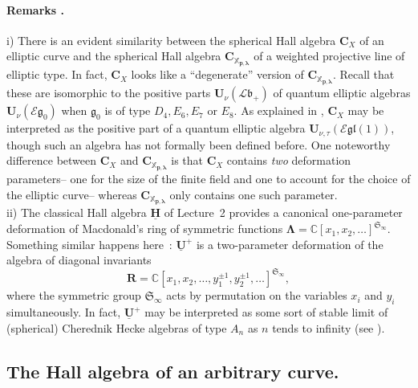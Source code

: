 \documentclass[a4paper,10pt]{amsart}
\def\H{\mathbf{H}}
\def\U{\mathbf{U}}
\def\C{\mathbb{C}}
\def\CC{\mathbf{C}}
\def\g{\mathfrak{g}}
\def\bo{\mathfrak{b}}
\def\LLambda{\boldsymbol{\Lambda}}
\def\xpl{\mathbb{X}_{\mathbf{p},\boldsymbol{\lambda}}}
\numberwithin{equation}{section}
\begin{document}
{\paragraph{\textbf{Remarks \thetheo.}} i) There is an evident similarity between the spherical Hall algebra $\CC_X$ of an elliptic curve and the spherical Hall algebra $\CC_{\xpl}$ of a weighted projective line of elliptic type. In fact, $\CC_X$ looks like a ``degenerate'' version of $\CC_{\xpl}$. Recall that these are isomorphic to the positive parts $\U_{\nu}(\mathcal{L}\bo_+)$ of quantum elliptic algebras $\U_{\nu}(\mathcal{E}{\g_0})$ when $\g_0$ is of type $D_4, E_6, E_7$ or $E_8$. As explained in \cite{SV}, $\CC_X$ may be interpreted as the positive part of a quantum elliptic algebra $\U_{\nu, \tau}(\mathcal{E}{\mathfrak{gl}(1)})$, though such an algebra has not formally been defined before. One noteworthy difference between $\CC_X$ and $\CC_{\xpl}$ is that $\CC_X$ contains \textit{two} deformation parameters-- one for the size of the finite field and one to account for the choice of the elliptic curve-- whereas $\CC_{\xpl}$ only contains one such parameter.\\
ii) The classical Hall algebra $\underline{\H}$ of Lecture~2 provides a canonical one-parameter deformation of Macdonald's ring of symmetric functions $\LLambda=\C[x_1,x_2, \ldots]^{\mathfrak{S}_{\infty}}$. Something similar happens here~: $\underline{\U}^+$ is a two-parameter  deformation of the algebra of diagonal invariants
$$\mathbf{R}=\C[x_1, x_2, \ldots, y_1^{\pm 1}, y_2^{\pm 1}, \ldots ]^{\mathfrak{S}_{\infty}},$$
where the symmetric group $\mathfrak{S}_{\infty}$ acts by permutation on the variables $x_i$ and $y_i$ simultaneously. In fact, $\underline{\U}^+$ may be interpreted as some sort of stable limit of (spherical) Cherednik Hecke algebras of type $A_n$ as $n$ tends to infinity (see \cite{SV}).

\vspace{.2in}

\subsection{The Hall algebra of an arbitrary curve.}

\vspace{.15in}

}
\end{document}
